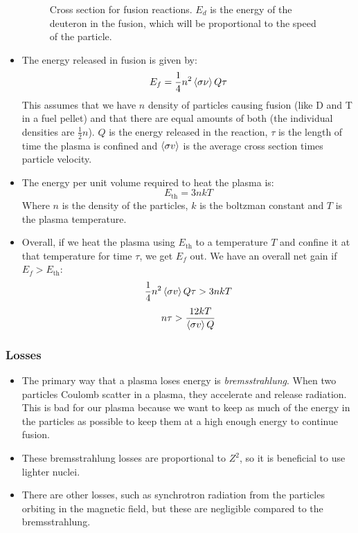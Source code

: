 \documentclass[letter]{article}
\begin{document}
\begin{itemize}
\begin{figure}[hbtp]
    \caption{Cross section for fusion
      reactions. $E_d$ is the energy of the deuteron in the fusion,
      which will be proportional to the speed of the particle.~\cite[pp. 532]{krane}}
    \label{fig:fusion_xsec}
  \end{figure}
\item The energy released in fusion is given by:
  \begin{equation*}
    E_f = \frac{1}{4}n^2\braket{\sigma\nu}Q\tau
  \end{equation*}
This assumes that we have $n$ density of particles causing fusion (like D
and T in a fuel pellet) and that there are equal amounts of both (the
individual densities are $\frac{1}{2}n$). $Q$ is the energy released
in the reaction, $\tau$ is the length of time the plasma is confined
and $\braket{\sigma{}v}$ is the average cross section times particle
velocity.~\cite[pp. 541]{krane}
\item The energy per unit volume required to heat the plasma is:
  \begin{equation*}
    E_{\text{th}} = 3nkT
  \end{equation*}
Where $n$ is the density of the particles, $k$ is the boltzman
constant and $T$ is the plasma temperature.~\cite[pp. 541]{krane}
\item Overall, if we heat the plasma using $E_{\text{th}}$ to a
  temperature $T$ and confine it at that temperature for time $\tau$,
  we get $E_f$ out. We have an overall net gain if $E_f >
  E_{\text{th}}$:
  \begin{equation*}
    \frac{1}{4}n^2\braket{\sigma{}v}Q\tau > 3nkT
  \end{equation*}
  \begin{equation*}
    n\tau > \frac{12kT}{\braket{\sigma{}v}Q}
  \end{equation*}
\cite[pp. 541-542]{krane}
\end{itemize}

\subsubsection{Losses}

\begin{itemize}
\item The primary way that a plasma loses energy is
  \textit{bremsstrahlung}. When two particles Coulomb scatter in a
  plasma, they accelerate and release radiation. This is bad for our
  plasma because we want to keep as much of the energy in the
  particles as possible to keep them at a high enough energy to
  continue fusion.~\cite[pp. 539]{krane}
\item These bremsstrahlung losses are proportional to $Z^2$, so it is
  beneficial to use lighter nuclei.~\cite[pp. 540]{krane}
\item There are other losses, such as synchrotron radiation from the
  particles orbiting in the magnetic field, but these are negligible
  compared to the bremsstrahlung.
\end{itemize}


\end{document}
